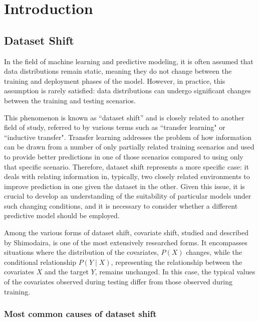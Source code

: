 \chapter{Introduction}


\section{Dataset Shift}


\par In the field of machine learning and predictive modeling, it is often assumed that data distributions remain static, meaning they do not change between the training and deployment phases of the model. However, in practice, this assumption is rarely satisfied: data distributions can undergo significant changes between the training and testing scenarios.

\par This phenomenon is known as ``dataset shift''\cite{shiftbook} and is closely related to another field of study, referred to by various terms such as ``transfer learning" or ``inductive transfer". Transfer learning addresses the problem of how information can be drawn from a number of only partially related training scenarios and used to provide better predictions in one of those scenarios compared to using only that specific scenario. Therefore, dataset shift represents a more specific case: it deals with relating information in, typically, two closely related environments to improve prediction in one given the dataset in the other. Given this issue, it is crucial to develop an understanding of the suitability of particular models under such changing conditions, and it is necessary to consider whether a different predictive model should be employed.

Among the various forms of dataset shift, covariate shift, studied and described by Shimodaira\cite{SHIMODAIRA2000227}, is one of the most extensively researched forms. It encompasses situations where the distribution of the covariates, $P(X)$ changes, while the conditional relationship $P(Y \mid X)$, representing the relationship between the covariates $X$ and the target $Y$, remains unchanged. In this case, the typical values of the covariates observed during testing differ from those observed during training.

	
\subsection{Most common causes of dataset shift}
	
